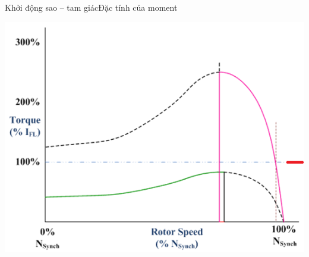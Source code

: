 \documentclass[17pt]{beamer}
\begin{document}
\begin{frame}{Khởi động sao -- tam giác}{Đặc tính của moment}
\vspace{-.5cm}
\begin{center}
\includegraphics[scale=.47]{images-chude1/moment-sao-tamgiac.png} 
\end{center}
\end{frame}
\end{document}

